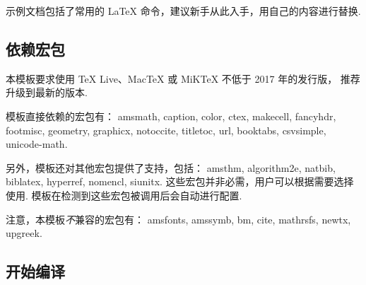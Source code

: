 \documentclass[a4paper]{ltxdoc}
\DeclareRobustCommand\pkg{\textsf}
\begin{document}
示例文档包括了常用的 \LaTeX{} 命令，建议新手从此入手，用自己的内容进行替换.


\subsection{依赖宏包}

本模板要求使用 TeX Live、MacTeX 或 MiKTeX 不低于 2017 年的发行版，
推荐升级到最新的版本.

模板直接依赖的宏包有：
\pkg{amsmath},
\pkg{caption},
\pkg{color},
\pkg{ctex},
\pkg{makecell},
\pkg{fancyhdr},
\pkg{footmisc},
\pkg{geometry},
\pkg{graphicx},
\pkg{notoccite},
\pkg{titletoc},
\pkg{url},
\pkg{booktabs},
\pkg{csvsimple},
\pkg{unicode-math}.

另外，模板还对其他宏包提供了支持，包括：
\pkg{amsthm},
\pkg{algorithm2e},
\pkg{natbib},
\pkg{biblatex},
\pkg{hyperref},
\pkg{nomencl},
\pkg{siunitx}.
这些宏包并非必需，用户可以根据需要选择使用.
模板在检测到这些宏包被调用后会自动进行配置.

注意，本模板\emph{不}兼容的宏包有：
\pkg{amsfonts},
\pkg{amssymb},
\pkg{bm},
\pkg{cite},
\pkg{mathrsfs},
\pkg{newtx},
\pkg{upgreek}.


\subsection{开始编译}
\end{document}
